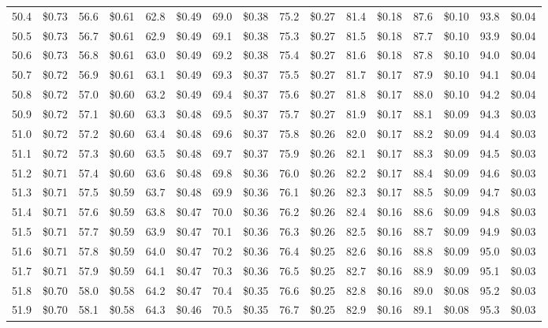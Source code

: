 \documentclass{article}
\begin{document}
\begin{tabular}{|*{8}{rr|}}
50.4 & \$0.73 & 56.6 & \$0.61 & 62.8 & \$0.49 & 69.0 & \$0.38 & 75.2 & \$0.27 & 81.4 & \$0.18 & 87.6 & \$0.10 & 93.8 & \$0.04\\
50.5 & \$0.73 & 56.7 & \$0.61 & 62.9 & \$0.49 & 69.1 & \$0.38 & 75.3 & \$0.27 & 81.5 & \$0.18 & 87.7 & \$0.10 & 93.9 & \$0.04\\
50.6 & \$0.73 & 56.8 & \$0.61 & 63.0 & \$0.49 & 69.2 & \$0.38 & 75.4 & \$0.27 & 81.6 & \$0.18 & 87.8 & \$0.10 & 94.0 & \$0.04\\
50.7 & \$0.72 & 56.9 & \$0.61 & 63.1 & \$0.49 & 69.3 & \$0.37 & 75.5 & \$0.27 & 81.7 & \$0.17 & 87.9 & \$0.10 & 94.1 & \$0.04\\
50.8 & \$0.72 & 57.0 & \$0.60 & 63.2 & \$0.49 & 69.4 & \$0.37 & 75.6 & \$0.27 & 81.8 & \$0.17 & 88.0 & \$0.10 & 94.2 & \$0.04\\
50.9 & \$0.72 & 57.1 & \$0.60 & 63.3 & \$0.48 & 69.5 & \$0.37 & 75.7 & \$0.27 & 81.9 & \$0.17 & 88.1 & \$0.09 & 94.3 & \$0.03\\
51.0 & \$0.72 & 57.2 & \$0.60 & 63.4 & \$0.48 & 69.6 & \$0.37 & 75.8 & \$0.26 & 82.0 & \$0.17 & 88.2 & \$0.09 & 94.4 & \$0.03\\
51.1 & \$0.72 & 57.3 & \$0.60 & 63.5 & \$0.48 & 69.7 & \$0.37 & 75.9 & \$0.26 & 82.1 & \$0.17 & 88.3 & \$0.09 & 94.5 & \$0.03\\
51.2 & \$0.71 & 57.4 & \$0.60 & 63.6 & \$0.48 & 69.8 & \$0.36 & 76.0 & \$0.26 & 82.2 & \$0.17 & 88.4 & \$0.09 & 94.6 & \$0.03\\
51.3 & \$0.71 & 57.5 & \$0.59 & 63.7 & \$0.48 & 69.9 & \$0.36 & 76.1 & \$0.26 & 82.3 & \$0.17 & 88.5 & \$0.09 & 94.7 & \$0.03\\
51.4 & \$0.71 & 57.6 & \$0.59 & 63.8 & \$0.47 & 70.0 & \$0.36 & 76.2 & \$0.26 & 82.4 & \$0.16 & 88.6 & \$0.09 & 94.8 & \$0.03\\
51.5 & \$0.71 & 57.7 & \$0.59 & 63.9 & \$0.47 & 70.1 & \$0.36 & 76.3 & \$0.26 & 82.5 & \$0.16 & 88.7 & \$0.09 & 94.9 & \$0.03\\
51.6 & \$0.71 & 57.8 & \$0.59 & 64.0 & \$0.47 & 70.2 & \$0.36 & 76.4 & \$0.25 & 82.6 & \$0.16 & 88.8 & \$0.09 & 95.0 & \$0.03\\
51.7 & \$0.71 & 57.9 & \$0.59 & 64.1 & \$0.47 & 70.3 & \$0.36 & 76.5 & \$0.25 & 82.7 & \$0.16 & 88.9 & \$0.09 & 95.1 & \$0.03\\
51.8 & \$0.70 & 58.0 & \$0.58 & 64.2 & \$0.47 & 70.4 & \$0.35 & 76.6 & \$0.25 & 82.8 & \$0.16 & 89.0 & \$0.08 & 95.2 & \$0.03\\
51.9 & \$0.70 & 58.1 & \$0.58 & 64.3 & \$0.46 & 70.5 & \$0.35 & 76.7 & \$0.25 & 82.9 & \$0.16 & 89.1 & \$0.08 & 95.3 & \$0.03\\

\end{tabular}
\end{document}
